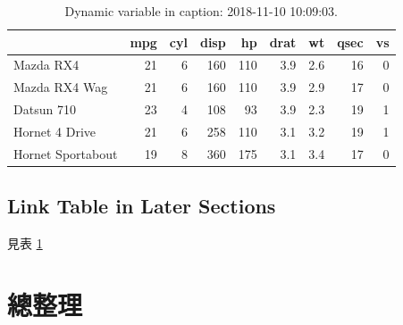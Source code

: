 \documentclass[oneside]{book}
\theoremstyle{definition}
\theoremstyle{definition}
\theoremstyle{definition}
\theoremstyle{remark}
\begin{document}
\begin{table}[t]

\caption{\label{tab:mtcar}Dynamic variable in caption: 2018-11-10 10:09:03.}
\centering
\begin{tabular}{lrrrrrrrr}
\toprule
  & mpg & cyl & disp & hp & drat & wt & qsec & vs\\
\midrule
Mazda RX4 & 21 & 6 & 160 & 110 & 3.9 & 2.6 & 16 & 0\\
Mazda RX4 Wag & 21 & 6 & 160 & 110 & 3.9 & 2.9 & 17 & 0\\
Datsun 710 & 23 & 4 & 108 & 93 & 3.9 & 2.3 & 19 & 1\\
Hornet 4 Drive & 21 & 6 & 258 & 110 & 3.1 & 3.2 & 19 & 1\\
Hornet Sportabout & 19 & 8 & 360 & 175 & 3.1 & 3.4 & 17 & 0\\
\bottomrule
\end{tabular}
\end{table}

\subsection*{Link Table in Later
Sections}\label{link-table-in-later-sections}

見表 \ref{tab:mtcar}

\section{總整理}
\end{document}
